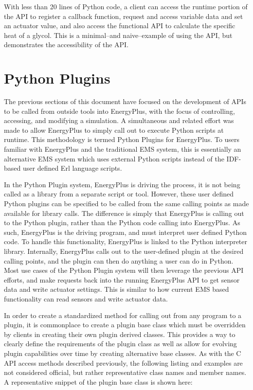 \documentclass[5p]{elsarticle}
\begin{document}
With less than 20 lines of Python code, a client can access the runtime portion of the API to register a callback function, request and access variable data and set an actuator value, and also access the functional API to calculate the specific heat of a glycol.  This is a minimal--and naive--example of using the API, but demonstrates the accessibility of the API.

 \section{Python Plugins}
The previous sections of this document have focused on the development of APIs to be called from outside tools into EnergyPlus, with the focus of controlling, accessing, and modifying a simulation.  A simultaneous and related effort was made to allow EnergyPlus to simply call out to execute Python scripts at runtime.  This methodology is termed Python Plugins for EnergyPlus.  To users familiar with EnergyPlus and the traditional EMS system, this is essentially an alternative EMS system which uses external Python scripts instead of the IDF-based user defined Erl language scripts.

In the Python Plugin system, EnergyPlus is driving the process, it is not being called as a library from a separate script or tool.  However, these user defined Python plugins can be specified to be called from the same calling points as made available for library calls.  The difference is simply that EnergyPlus is calling out to the Python plugin, rather than the Python code calling into EnergyPlus.  As such, EnergyPlus is the driving program, and must interpret user defined Python code.  To handle this functionality, EnergyPlus is linked to the Python interpreter library.    Internally, EnergyPlus calls out to the user-defined plugin at the desired calling points, and the plugin can then do anything a user can do in Python.  Most use cases of the Python Plugin system will then leverage the previous API efforts, and make requests back into the running EnergyPlus API to get sensor data and write actuator settings.  This is similar to how current EMS based functionality can read sensors and write actuator data.

In order to create a standardized method for calling out from any program to a plugin, it is commonplace to create a plugin base class which must be overridden by clients in creating their own plugin derived classes.  This provides a way to clearly define the requirements of the plugin class as well as allow for evolving plugin capabilities over time by creating alternative base classes.  As with the C API access methods described previously, the following listing and examples are not considered official, but rather representative class names and member names.  A representative snippet of the plugin base class is shown here:
\end{document}
